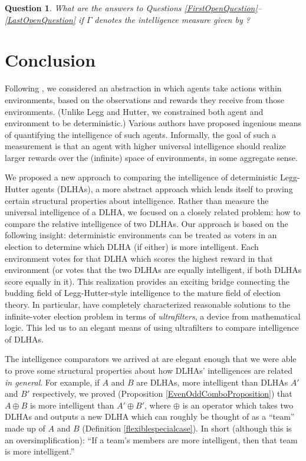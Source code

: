 \documentclass[twoside,11pt]{article}
\newtheorem{question}[theorem]{Question}
\begin{document}
\begin{question}
\label{ReallyLastOpenquestion}
    What are the answers to Questions \ref{FirstOpenQuestion}--\ref{LastOpenQuestion}
    if $\varGamma$ denotes the intelligence measure given by
    \citet{hibbard}?
\end{question}

\section{Conclusion}
\label{conclusionsection}

Following \citet{hutter2007}, we considered an abstraction in
which agents take actions within environments, based on the observations and
rewards they receive from those environments.
(Unlike Legg and Hutter, we constrained both agent and environment to be
deterministic.)
Various authors
\citep{hutter2007, hernandez, hibbard} have proposed
ingenious means of quantifying the intelligence
of such agents.
Informally, the goal of such a measurement is that
an agent with higher universal intelligence should realize larger rewards
over the (infinite) space of environments, in some aggregate
sense.

We proposed a new approach to comparing the intelligence of
deterministic Legg-Hutter agents (DLHAs), a more
abstract approach which lends itself to proving certain structural properties
about intelligence. Rather than measure the universal intelligence of a
DLHA, we focused on a closely related problem: how to compare the relative
intelligence of two DLHAs. Our approach is based on the following
insight: deterministic environments can be treated as voters in an election to determine
which DLHA (if either) is more intelligent. Each environment votes for that
DLHA which scores the highest reward in that environment (or votes that the
two DLHAs are equally intelligent, if both DLHAs score equally in it).
This realization provides an exciting bridge connecting the budding field of
Legg-Hutter-style intelligence to
the mature field of election theory.
In particular,
\citet{kirman} have completely characterized
reasonable solutions to the infinite-voter election problem in terms of \emph{ultrafilters},
a device from mathematical logic. This led us to an elegant means
of using ultrafilters to compare intelligence of DLHAs.

The intelligence comparators we arrived at are elegant enough that
we were able to prove some structural properties about how DLHAs'
intelligences are related \emph{in general}. For example, if $A$ and $B$ are
DLHAs, more intelligent than DLHAs $A'$ and $B'$ respectively, we proved
(Proposition \ref{EvenOddComboProposition}) that
$A\oplus B$ is more intelligent than $A'\oplus B'$, where $\oplus$ is an
operator which takes two DLHAs and outputs a new DLHA which can roughly
be thought of as a ``team'' made up of $A$ and $B$
(Definition \ref{flexiblespecialcase}).
In short (although this is an oversimplification):
``If a team's members are more intelligent, then that team is more intelligent.''
\end{document}
